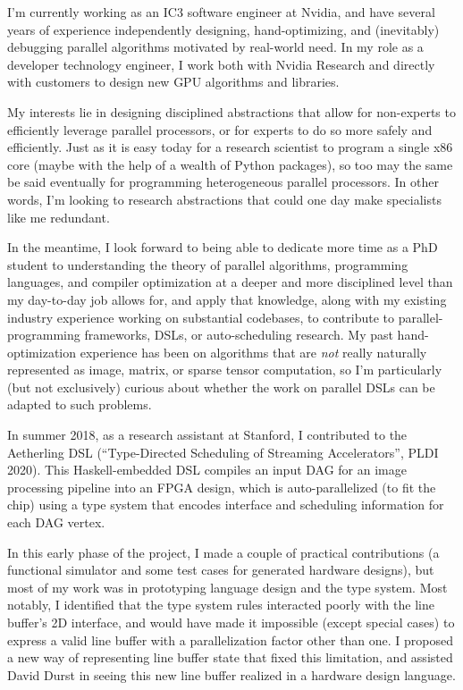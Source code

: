 


\raggedright
\reversemarginpar

I'm currently working as an IC3 software engineer at Nvidia, and have
several years of experience independently designing, hand-optimizing,
and (inevitably) debugging parallel algorithms motivated by real-world
need. In my role as a developer technology engineer, I work both with
Nvidia Research and directly with customers to design new GPU
algorithms and libraries.

My interests lie in designing disciplined abstractions that allow for
non-experts to efficiently leverage parallel processors, or for
experts to do so more safely and efficiently. Just as it is easy today
for a research scientist to program a single x86 core (maybe with the
help of a wealth of Python packages), so too may the same be said
eventually for programming heterogeneous parallel processors. In other
words, I'm looking to research abstractions that could one day make
specialists like me redundant.

In the meantime, I look forward to being able to dedicate more time as
a PhD student to understanding the theory of parallel algorithms,
programming languages, and compiler optimization at a deeper and more
disciplined level than my day-to-day job allows for, and apply that
knowledge, along with my existing industry experience working on
substantial codebases, to contribute to parallel-programming
frameworks, DSLs, or auto-scheduling research. My past
hand-optimization experience has been on algorithms that
are \textit{not} really naturally represented as image, matrix, or
sparse tensor computation, so I'm particularly (but not exclusively)
curious about whether the work on parallel DSLs can be adapted to such
problems.

In summer 2018, as a research assistant at Stanford, I contributed to
the Aetherling DSL (``Type-Directed Scheduling of Streaming
Accelerators'', PLDI 2020). This Haskell-embedded DSL compiles an
input DAG for an image processing pipeline into an FPGA design, which
is auto-parallelized (to fit the chip) using a type system that
encodes interface and scheduling information for each DAG vertex.

In this early phase of the project, I made a couple of practical
contributions (a functional simulator and some test cases for
generated hardware designs), but most of my work was in prototyping
language design and the type system.  Most notably, I identified that
the type system rules interacted poorly with the line buffer's 2D
interface, and would have made it impossible (except special cases) to
express a valid line buffer with a parallelization factor other than
one. I proposed a new way of representing line buffer state that fixed
this limitation, and assisted David Durst in seeing this new line
buffer realized in a hardware design language.

